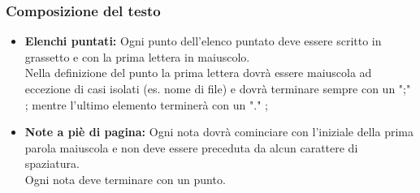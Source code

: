       \subsubsection{Composizione del testo}
        \begin{itemize}
          \item \textbf{Elenchi puntati: }Ogni punto dell'elenco puntato deve essere scritto in grassetto e con la prima lettera in maiuscolo.\\
            Nella definizione del punto la prima lettera dovrà essere maiuscola ad eccezione di casi isolati (es. nome di file) e dovrà terminare sempre con un ";" ; mentre l'ultimo elemento terminerà con un "." ;
          \item \textbf{Note a piè di pagina: }Ogni nota dovrà cominciare con l’iniziale della prima parola maiuscola e non deve essere preceduta da alcun carattere di spaziatura.\\
            Ogni nota deve terminare con un punto.
        \end{itemize}
